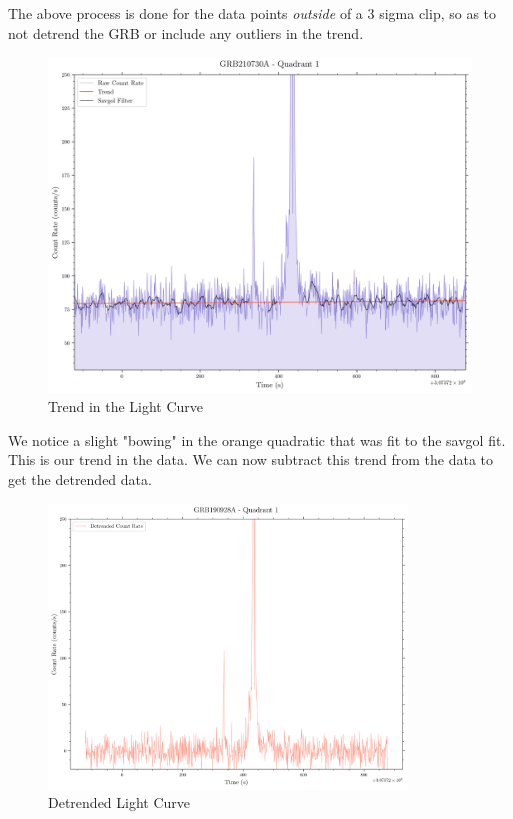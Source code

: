 \documentclass[11pt]{book} %
\begin{document}
The above process is done for the data points \textit{outside} of a 3 sigma clip, so as to not detrend the GRB or include any outliers in the trend. 


\begin{figure}[H]
    \centering
    \includegraphics[width=\textwidth]{Pictures/trend.png}
    \caption{Trend in the Light Curve}
\end{figure}

We notice a slight "bowing" in the orange quadratic that was fit to the savgol fit. This is our trend in the data. We can now subtract this trend from the data to get the detrended data.

\begin{figure}[H]
    \centering
    \includegraphics[width=0.85\textwidth]{Pictures/detrended.png}
    \caption{Detrended Light Curve}
\end{figure}
\end{document}
